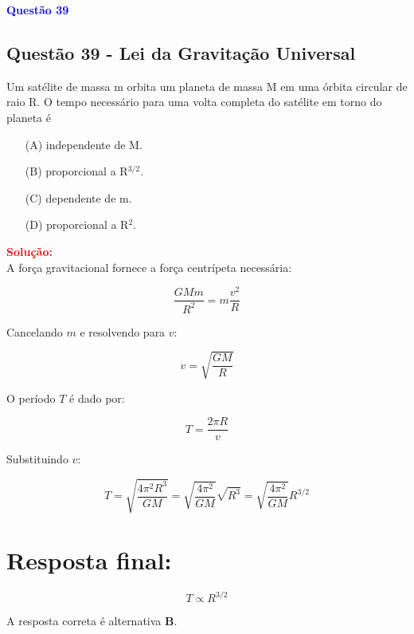 \begin{flushleft}
\textbf{\textcolor{blue}{\Large Quest\~ao 39}}\\
\noindent
\subsection{Quest\~ao 39 - Lei da Gravitação Universal}
Um satélite de massa m orbita um planeta de massa M em
uma órbita circular de raio R. O tempo necessário para uma
volta completa do satélite em torno do planeta é

\begin{itemize}
\item[(A)] independente de M.
\item[(B)] proporcional a R$^{3/2}$.
\item[(C)] dependente de m.
\item[(D)] proporcional a R$^{2}$.
\end{itemize}

\vspace{0.5cm}

\textcolor{red}{\textbf{Solução:}}\\

A força gravitacional fornece a força centrípeta necessária:

\[
\frac{G M m}{R^2} = m \frac{v^2}{R}
\]

Cancelando \(m\) e resolvendo para \(v\):

\[
v = \sqrt{\frac{G M}{R}}
\]

O período \(T\) é dado por:

\[
T = \frac{2\pi R}{v}
\]

Substituindo \(v\):

\[
T =
\sqrt{\frac{4 \pi^{2} R^{3}}{G M}} =\sqrt{\frac{4 \pi^{2}}{G M}}\sqrt{R^{3}} = \sqrt{\frac{4 \pi^{2}}{G M}} R^{3/2}
\]


\section*{Resposta final:}

\[
\boxed{
T \propto R^{3/2}
}
\]


A resposta correta é alternativa \colorbox{green!50}{\textbf{B}}.
\end{flushleft}

